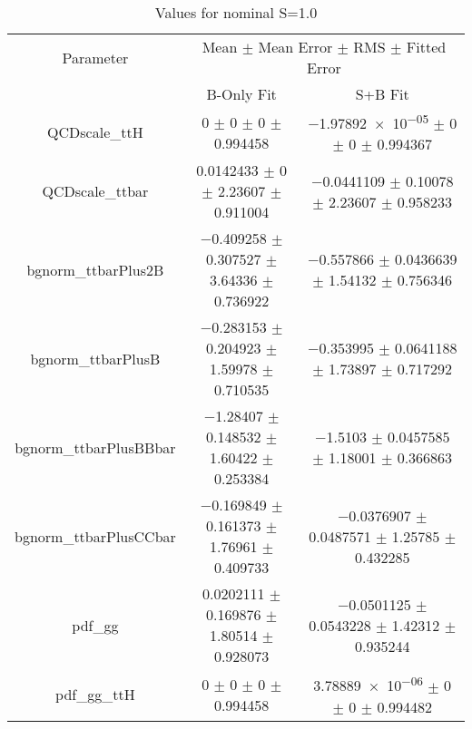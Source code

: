 \begin{table}
\centering
\caption{Values for nominal S=1.0}
\begin{tabular}{ccc}
\toprule
Parameter & \multicolumn{2}{c}{Mean $\pm$ Mean Error $\pm$ RMS $\pm$ Fitted Error}\\
 & B-Only Fit & S+B Fit\\
\midrule
QCDscale\_ttH & \num{0} $\pm$ \num{0} $\pm$ \num{0} $\pm$ \num{0.994458} & \num{-1.97892e-05} $\pm$ \num{0} $\pm$ \num{0} $\pm$ \num{0.994367}\\
QCDscale\_ttbar & \num{0.0142433} $\pm$ \num{0} $\pm$ \num{2.23607} $\pm$ \num{0.911004} & \num{-0.0441109} $\pm$ \num{0.10078} $\pm$ \num{2.23607} $\pm$ \num{0.958233}\\
bgnorm\_ttbarPlus2B & \num{-0.409258} $\pm$ \num{0.307527} $\pm$ \num{3.64336} $\pm$ \num{0.736922} & \num{-0.557866} $\pm$ \num{0.0436639} $\pm$ \num{1.54132} $\pm$ \num{0.756346}\\
bgnorm\_ttbarPlusB & \num{-0.283153} $\pm$ \num{0.204923} $\pm$ \num{1.59978} $\pm$ \num{0.710535} & \num{-0.353995} $\pm$ \num{0.0641188} $\pm$ \num{1.73897} $\pm$ \num{0.717292}\\
bgnorm\_ttbarPlusBBbar & \num{-1.28407} $\pm$ \num{0.148532} $\pm$ \num{1.60422} $\pm$ \num{0.253384} & \num{-1.5103} $\pm$ \num{0.0457585} $\pm$ \num{1.18001} $\pm$ \num{0.366863}\\
bgnorm\_ttbarPlusCCbar & \num{-0.169849} $\pm$ \num{0.161373} $\pm$ \num{1.76961} $\pm$ \num{0.409733} & \num{-0.0376907} $\pm$ \num{0.0487571} $\pm$ \num{1.25785} $\pm$ \num{0.432285}\\
pdf\_gg & \num{0.0202111} $\pm$ \num{0.169876} $\pm$ \num{1.80514} $\pm$ \num{0.928073} & \num{-0.0501125} $\pm$ \num{0.0543228} $\pm$ \num{1.42312} $\pm$ \num{0.935244}\\
pdf\_gg\_ttH & \num{0} $\pm$ \num{0} $\pm$ \num{0} $\pm$ \num{0.994458} & \num{3.78889e-06} $\pm$ \num{0} $\pm$ \num{0} $\pm$ \num{0.994482}\\
\bottomrule
\end{tabular}
\end{table}